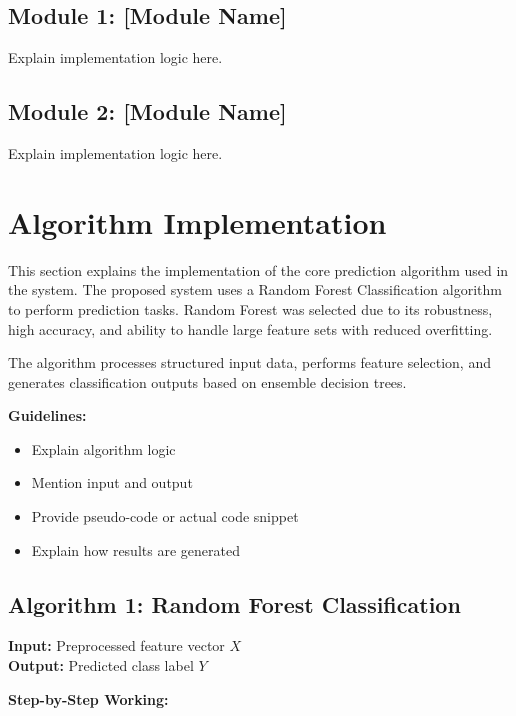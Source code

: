 \subsection{Module 1: [Module Name]}
Explain implementation logic here.

\subsection{Module 2: [Module Name]}
Explain implementation logic here.



\section{Algorithm Implementation}

This section explains the implementation of the core prediction algorithm used in the system. 
The proposed system uses a Random Forest Classification algorithm to perform prediction tasks. 
Random Forest was selected due to its robustness, high accuracy, and ability to handle 
large feature sets with reduced overfitting.

The algorithm processes structured input data, performs feature selection, 
and generates classification outputs based on ensemble decision trees.

\textbf{Guidelines:}
\begin{itemize}
    \item Explain algorithm logic
    \item Mention input and output
    \item Provide pseudo-code or actual code snippet
    \item Explain how results are generated
\end{itemize}

\subsection{Algorithm 1: Random Forest Classification}

\textbf{Input:} Preprocessed feature vector $X$ \\
\textbf{Output:} Predicted class label $Y$

\textbf{Step-by-Step Working:}


